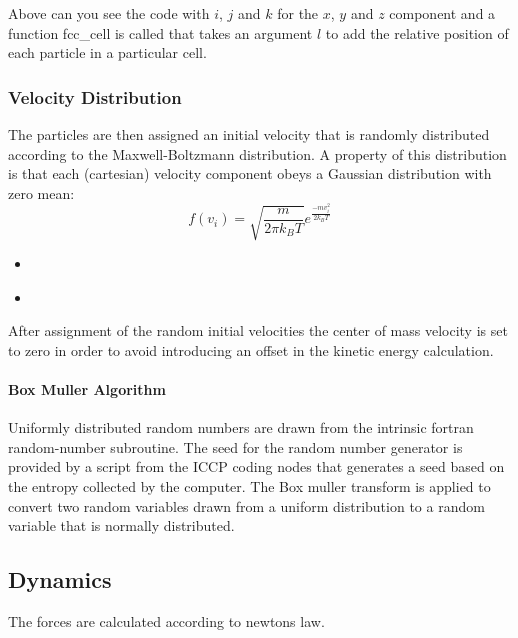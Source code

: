 \documentclass[
10pt, %
a4paper, %
oneside, %
headinclude,footinclude, %
BCOR5mm, %
]{scrartcl}
\newcommand{\insertcode}[2]{\begin{itemize}\item[]\end{itemize}} %
\begin{document}
Above can you see the code with $i$, $j$ and $k$ for the $x$, $y$ and $z$ component and a function fcc\_cell is called that takes an argument $l$ to add the relative position of each particle in a particular cell.


\subsubsection{Velocity Distribution}

The particles are then assigned an initial velocity that is randomly distributed according to the Maxwell-Boltzmann distribution. A property of this distribution is that each (cartesian) velocity component obeys a Gaussian distribution with zero mean:
$$ f(v_i) = \sqrt{\frac{m}{2\pi k_B T}} e^{\frac{-mv_i^2}{2k_BT}} $$

\insertcode{"Scripts/initialization_snippet_2.f90"}{Generating initial velocities} %

\insertcode{"Scripts/initialization_snippet_3.f90"}{Removing the center of mass degree of freedom} %

After assignment of the random initial velocities the center of mass velocity is set to zero in order to avoid introducing an offset in the kinetic energy calculation.

\paragraph{Box Muller Algorithm}
Uniformly distributed random numbers are drawn from the intrinsic fortran random-number subroutine. The seed for the random number generator is provided by a script \cite{} from the ICCP coding nodes that generates a seed based on the entropy collected by the computer. The Box muller transform \cite{} is applied to convert two random variables drawn from a uniform distribution to a random variable that is normally distributed.



\subsection{Dynamics}

The forces are calculated according to newtons law.
\end{document}
